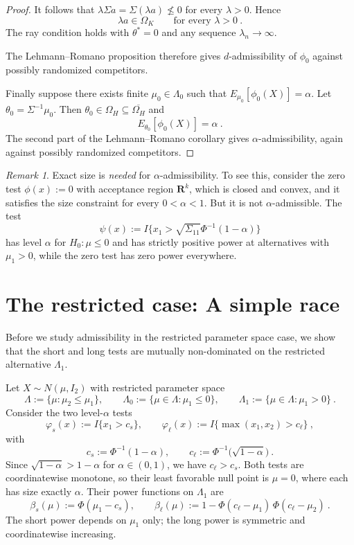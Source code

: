 \documentclass[12pt]{article}
\theoremstyle{definition}
\theoremstyle{remark}
\newtheorem{remark}{Remark}
\begin{document}
\begin{proof}
It follows that $\lambda\Sigma a = \Sigma(\lambda a)\not\le 0$ for every $\lambda>0$. Hence
\[
\lambda a\in\Omega_K
\qquad\text{for every }\lambda>0~.
\]
The ray condition holds with $\theta^*=0$ and any sequence $\lambda_n\to\infty$.

The Lehmann--Romano proposition therefore gives $d$-admissibility of $\phi_0$ against possibly randomized competitors.

Finally suppose there exists finite $\mu_0\in\Lambda_0$ such that $E_{\mu_0}[\phi_0(X)]=\alpha$. Let $\theta_0=\Sigma^{-1}\mu_0$. Then $\theta_0\in\Omega_H\subseteq\overline{\Omega_H}$ and
\[
E_{\theta_0}[\phi_0(X)]=\alpha~.
\]
The second part of the Lehmann--Romano corollary gives $\alpha$-admissibility, again against possibly randomized competitors.
\end{proof}

\begin{remark}
    Exact size is \emph{needed} for $\alpha$-admissibility. To see this, consider the zero test $\phi(x):=0$ with acceptance region $\mathbf R^k$, which is closed and convex, and it satisfies the size constraint for every $0<\alpha<1$. But it is not $\alpha$-admissible. The test
    \[
    \psi(x):=I\{x_1>\sqrt{\Sigma_{11}}\Phi^{-1}(1-\alpha)\}
    \]
    has level $\alpha$ for $H_0:\mu\le 0$ and has strictly positive power at alternatives with $\mu_1>0$, while the zero test has zero power everywhere.
\end{remark}


\section*{The restricted case: A simple race}
Before we study admissibility in the restricted parameter space case, we show that the short and long tests are mutually non-dominated on the restricted alternative $\Lambda_1$.

Let $X\sim N(\mu,I_2)$ with restricted parameter space
\[
\Lambda:=\{\mu:\mu_2\le\mu_1\},\qquad
\Lambda_0:=\{\mu\in\Lambda:\mu_1\le0\},\qquad
\Lambda_1:=\{\mu\in\Lambda:\mu_1>0\}~.
\]
Consider the two level-$\alpha$ tests
\[
\varphi_s(x):=I\{x_1>c_s\},\qquad
\varphi_\ell(x):=I\{\max(x_1,x_2)>c_\ell\}~,
\]
with
\[
c_s:=\Phi^{-1}(1-\alpha),\qquad
c_\ell:=\Phi^{-1}\!\big(\sqrt{1-\alpha}\big)~.
\]
Since $\sqrt{1-\alpha}>1-\alpha$ for $\alpha\in(0,1)$, we have $c_\ell>c_s$. Both tests are coordinatewise monotone, so their least favorable null point is $\mu=0$, where each has size exactly $\alpha$. Their power functions on $\Lambda_1$ are
\[
\beta_s(\mu):=\Phi(\mu_1-c_s),\qquad
\beta_\ell(\mu):=1-\Phi(c_\ell-\mu_1)\,\Phi(c_\ell-\mu_2)~.
\]
The short power depends on $\mu_1$ only; the long power is symmetric and coordinatewise increasing.
\end{document}
